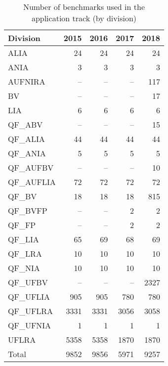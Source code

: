 \documentclass[twoside,11pt]{article}
\begin{document}
\begin{table}
  \caption{Number of benchmarks used in the application track (by
    division)}
  \label{table:benchmarks-application-track}
  \centering
  \begin{tabular}{|l|r|r|r|r|}
    \hline
    Division & \multicolumn{1}{c|}{2015} & \multicolumn{1}{c|}{2016} & \multicolumn{1}{c|}{2017} & \multicolumn{1}{c|}{2018} \\
    \hline
    ALIA       &   24 &   24 &   24 &   24 \\
    ANIA       &    3 &    3 &    3 &    3 \\
    AUFNIRA    &   -- &   -- &   -- &  117 \\
    BV         &   -- &   -- &   -- &   17 \\
    LIA        &    6 &    6 &    6 &    6 \\
    QF\_ABV    &   -- &   -- &   -- &   15 \\
    QF\_ALIA   &   44 &   44 &   44 &   44 \\
    QF\_ANIA   &    5 &    5 &    5 &    5 \\
    QF\_AUFBV  &   -- &   -- &   -- &   10 \\
    QF\_AUFLIA &   72 &   72 &   72 &   72 \\
    QF\_BV     &   18 &   18 &   18 &  815 \\
    QF\_BVFP   &   -- &   -- &    2 &    2 \\
    QF\_FP     &   -- &   -- &    2 &    2 \\
    QF\_LIA    &   65 &   69 &   68 &   69 \\
    QF\_LRA    &   10 &   10 &   10 &   10 \\
    QF\_NIA    &   10 &   10 &   10 &   10 \\
    QF\_UFBV   &   -- &   -- &   -- & 2327 \\
    QF\_UFLIA  &  905 &  905 &  780 &  780 \\
    QF\_UFLRA  & 3331 & 3331 & 3056 & 3058 \\
    QF\_UFNIA  &    1 &    1 &    1 &    1 \\
    UFLRA      & 5358 & 5358 & 1870 & 1870 \\
    \hline
    Total      & 9852 & 9856 & 5971 & 9257 \\
    \hline
  \end{tabular}
\end{table}
\end{document}
